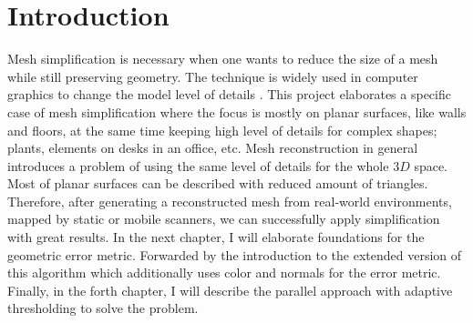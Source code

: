 \chapter{Introduction}
\setcounter{page}{1}%
\thispagestyle{empty}

Mesh simplification is necessary when one wants to reduce the size of a mesh while still preserving geometry. The technique is widely used in computer graphics to change the model level of details \cite{lod03}. This project elaborates a specific case of mesh simplification where the focus is mostly on planar surfaces, like walls and floors, at the same time keeping high level of details for complex shapes; plants, elements on desks in an office, etc. Mesh reconstruction in general introduces a problem of using the same level of details for the whole $3D$ space. Most of planar surfaces can be described with reduced amount of triangles. Therefore, after generating a reconstructed mesh from real-world environments, mapped by static or mobile scanners, we can successfully apply simplification with great results. In the next chapter, I will elaborate foundations for the geometric error metric. Forwarded by the introduction to the extended version of this algorithm which additionally uses color and normals for the error metric. Finally, in the forth chapter, I will describe the parallel approach with adaptive thresholding to solve the problem.